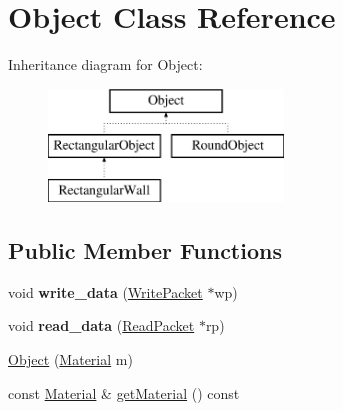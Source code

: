 \hypertarget{class_object}{\section{Object Class Reference}
\label{class_object}
}
Inheritance diagram for Object\-:\begin{figure}[H]
\begin{center}
\leavevmode
\includegraphics[height=3.000000cm]{class_object}
\end{center}
\end{figure}
\subsection*{Public Member Functions}
\begin{DoxyCompactItemize}
\item 
\hypertarget{class_object_a9b9c9d7a76b1dae92f07c51181513ca4}{void {\bfseries write\-\_\-data} (\hyperlink{class_write_packet}{Write\-Packet} $\ast$wp)}\label{class_object_a9b9c9d7a76b1dae92f07c51181513ca4}

\item 
\hypertarget{class_object_a38c8d7375c607ed8c60c7a21c1dfc21d}{void {\bfseries read\-\_\-data} (\hyperlink{class_read_packet}{Read\-Packet} $\ast$rp)}\label{class_object_a38c8d7375c607ed8c60c7a21c1dfc21d}

\item 
\hyperlink{class_object_af44c19b310b6567cd196a9dcd2f50e46}{Object} (\hyperlink{class_material}{Material} m)
\item 
const \hyperlink{class_material}{Material} \& \hyperlink{class_object_a8b4f09c5a0ab51e58a1d1c2da6f33a18}{get\-Material} () const 
\end{DoxyCompactItemize}
